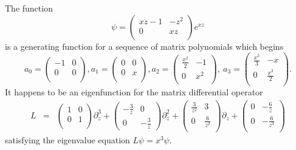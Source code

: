 \documentclass{amsart}
\theoremstyle{definition}
\theoremstyle{remark}
\numberwithin{equation}{section}
\begin{document}
The function
$$
\psi=\left(
\begin{array}{cc}
 x z-1 & -z^2 \\
 0 & x z \\
\end{array}
\right)e^{xz}
$$
is a generating function for a sequence of matrix polynomials which
begins
$$
a_0= \left(
\begin{array}{cc}
 -1 & 0 \\
 0 & 0\\
\end{array}
\right),
a_1= \left(
\begin{array}{cc}
 0 & 0 \\
 0 & x \\
\end{array}
\right),
a_2=\left(
\begin{array}{cc}
 \frac{x^2}{2} & -1 \\
 0 & x^2 \\
\end{array}
\right)
,\ a_3=\left(
\begin{array}{cc}
 \frac{x^3}{3} & -x \\
 0 & \frac{x^3}{2} \\
\end{array}
\right).
$$
It happens to be an eigenfunction for
the matrix differential operator
\begin{eqnarray*}
L&=&\left(
\begin{array}{cc}
 1 & 0 \\
 0 & 1 \\
\end{array}
\right)\partial_z^3
+
\left(
\begin{array}{cc}
 -\frac{3}{z} & 0 \\
 0 & -\frac{3}{z}
\end{array}
\right)\partial_z^2%
+
\left(
\begin{array}{cc}
 \frac{3}{z^2} & 3 \\
 0 & \frac{6}{z^2}\\
\end{array}
\right)\partial_z
+
\left(
\begin{array}{cc}
 0 & -\frac{6}{z} \\
 0 & -\frac{6}{z^3}\\
\end{array}
\right) 
\end{eqnarray*}
satisfying the eigenvalue equation
$
L\psi=x^3\psi.
$
\end{document}
